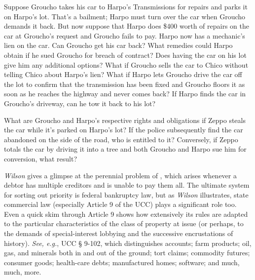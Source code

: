 \item Suppose Groucho takes his car to Harpo's Transmissions for repairs and
parks it on Harpo's lot. That's a bailment; Harpo must turn over the car when
Groucho demands it back. But now suppose that Harpo does \$400 worth of repairs
on the car at Groucho's request and Groucho fails to pay. Harpo now has a
mechanic's lien on the car. Can Groucho get his car back? What remedies could
Harpo obtain if he sued Groucho for breach of contract? Does having the car on
his lot give him any additional options? What if Groucho sells the car to Chico
without telling Chico about Harpo's lien? What if Harpo lets Groucho drive the
car off the lot to confirm that the transmission has been fixed and Groucho
floors it as soon as he reaches the highway and never comes back? If Harpo
finds the car in Groucho's driveway, can he tow it back to his lot?


\item What are Groucho and Harpo's respective rights and obligations if Zeppo
steals the car while it's parked on Harpo's lot? If the police subsequently
find the car abandoned on the side of the road, who is entitled to it?
Conversely, if Zeppo totals the car by driving it into a tree and both Groucho
and Harpo sue him for conversion, what result?


\item \textit{Wilson} gives a glimpse at the perennial problem of
, which arises whenever a debtor has multiple creditors and is
unable to pay them all. The ultimate system for sorting out priority is federal
bankruptcy law, but as \textit{Wilson} illustrates, state commercial law
(especially Article 9 of the UCC) plays a significant role too. Even a quick
skim through Article 9 shows how extensively its rules are adapted to the
particular characteristics of the class of property at issue (or perhaps, to
the demands of special-interest lobbying and the successive encrustations of
history). \emph{See, e.g.}, UCC {\S} 9-102, which distinguishes accounts; farm
products; oil, gas, and minerals both in and out of the ground; tort claims;
commodity futures; consumer goods; health-care debts; manufactured homes;
software; and much, much, more. 


